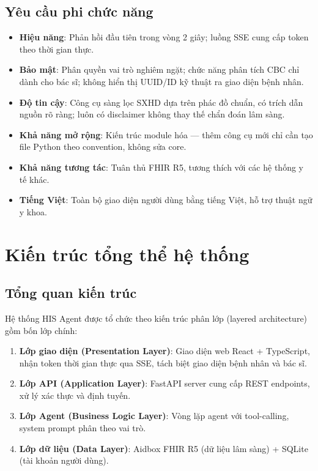 \documentclass[a4paper,13pt,3p,oneside]{report}
\theoremstyle{definition}
\theoremstyle{remark}
\theoremstyle{definition}
\begin{document}
\subsection{Yêu cầu phi chức năng}

\noindent\begin{minipage}{\linewidth}
\begin{itemize}
  \item \textbf{Hiệu năng}: Phản hồi đầu tiên trong vòng 2 giây; luồng SSE cung cấp token theo thời gian thực.
  \item \textbf{Bảo mật}: Phân quyền vai trò nghiêm ngặt; chức năng phân tích CBC chỉ dành cho bác sĩ; không hiển thị UUID/ID kỹ thuật ra giao diện bệnh nhân.
  \item \textbf{Độ tin cậy}: Công cụ sàng lọc SXHD dựa trên phác đồ chuẩn, có trích dẫn nguồn rõ ràng; luôn có disclaimer không thay thế chẩn đoán lâm sàng.
  \item \textbf{Khả năng mở rộng}: Kiến trúc module hóa --- thêm công cụ mới chỉ cần tạo file Python theo convention, không sửa core.
  \item \textbf{Khả năng tương tác}: Tuân thủ FHIR R5, tương thích với các hệ thống y tế khác.
  \item \textbf{Tiếng Việt}: Toàn bộ giao diện người dùng bằng tiếng Việt, hỗ trợ thuật ngữ y khoa.
\end{itemize}
\end{minipage}

\section{Kiến trúc tổng thể hệ thống}

\subsection{Tổng quan kiến trúc}

Hệ thống HIS Agent được tổ chức theo kiến trúc phân lớp (layered architecture) gồm bốn lớp chính:

\begin{enumerate}
  \item \textbf{Lớp giao diện (Presentation Layer)}: Giao diện web React + TypeScript, nhận token thời gian thực qua SSE, tách biệt giao diện bệnh nhân và bác sĩ.
  \item \textbf{Lớp API (Application Layer)}: FastAPI server cung cấp REST endpoints, xử lý xác thực và định tuyến.
  \item \textbf{Lớp Agent (Business Logic Layer)}: Vòng lặp agent với tool-calling, system prompt phân theo vai trò.
  \item \textbf{Lớp dữ liệu (Data Layer)}: Aidbox FHIR R5 (dữ liệu lâm sàng) + SQLite (tài khoản người dùng).
\end{enumerate}
\end{document}
